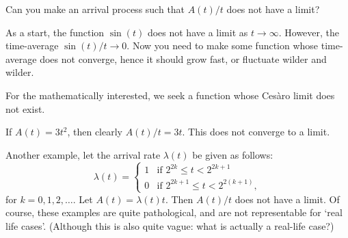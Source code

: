 \documentclass[queueing-book.tex]{subfiles}
\begin{document}
\begin{exercise}
  Can you make an arrival process such that $A(t)/t$ does not have a limit?
\begin{hint}
  As a start, the function $\sin(t)$ does not have a limit as $t\to\infty$.
  However, the time-average $\sin(t)/t \to 0$.
  Now you need to make some function whose time-average does not converge, hence it should grow fast, or fluctuate wilder and wilder.

 For the mathematically interested, we seek a function whose Ces\`aro limit does not exist.
\end{hint}
\begin{solution}
 If $A(t) = 3 t^2$, then clearly $A(t)/t = 3t$. This does not
 converge to a limit.

 Another example, let the arrival rate $\lambda(t)$ be given as follows:
 \begin{equation*}
 \lambda(t) =
 \begin{cases}
 1 & \text{if } 2^{2k} \leq t < 2^{2k+1} \\
 0 & \text{if } 2^{2k+1} \leq t < 2^{2(k+1)},
 \end{cases}
 \end{equation*}
 for $k=0,1,2,\ldots$.
 Let $A(t) = \lambda(t) t$.
 Then $A(t)/t$ does not have a limit.
 Of course, these examples are quite pathological, and are not representable for `real life cases'.
 (Although this is also quite vague:  what is actually a real-life case?)
\end{solution}
\end{exercise}


\end{document}
